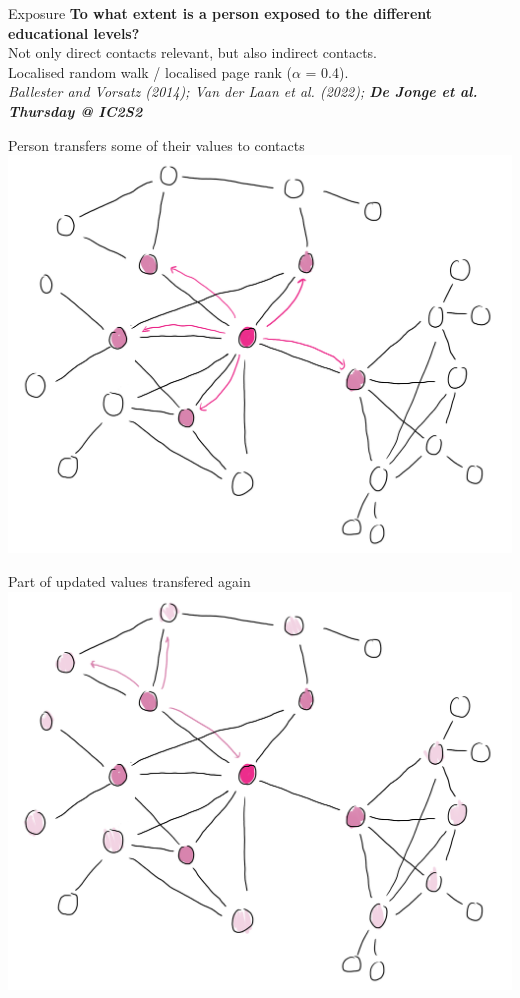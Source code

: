 \documentclass[aspectratio=169]{beamer}
\begin{document}
\begin{frame}{Exposure}
  \textbf{To what extent is a person exposed to the different educational levels?}\\[1em]

  Not only direct contacts relevant, but also indirect contacts.\\[2em]

  Localised random walk / localised page rank ($\alpha$ = 0.4).\\[1em]
  
  \vspace{5em}\scriptsize \it
  Ballester and Vorsatz (2014); Van der Laan \textit{et al.} (2022); \bf De Jonge \textit{et al.} Thursday @ IC2S2
\end{frame}

\begin{frame}{Person transfers some of their values to contacts}
\includegraphics[width=0.52\paperwidth]{figures/random_walk_01.png}
\end{frame}

\begin{frame}{Part of updated values transfered again}
\includegraphics[width=0.52\paperwidth]{figures/random_walk_02.png}
\end{frame}
\end{document}
